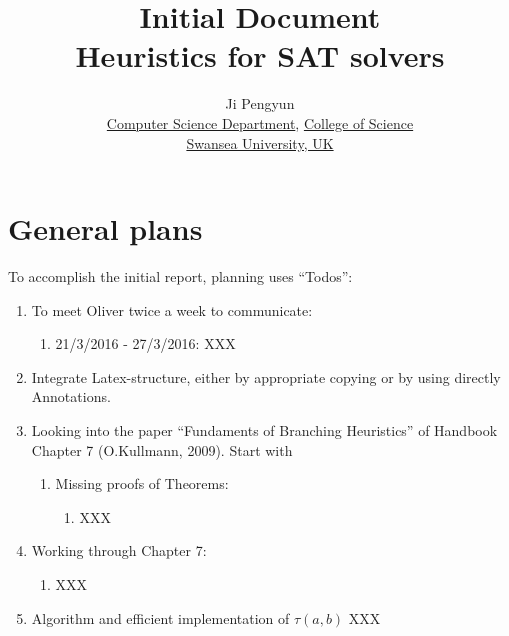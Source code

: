 \documentclass{report}
\begin{document}
\title{Initial Document\\Heuristics for SAT solvers}
\author{Ji Pengyun\\
  \href{http://www.swan.ac.uk/compsci/}{Computer Science Department}, \href{http://www.swan.ac.uk/science/}{College of Science}\\
   \href{http://www.swan.ac.uk/}{Swansea University, UK}\\
}

\maketitle

\tableofcontents

\chapter{General plans}
\label{cha:Generalpreparations}


To accomplish the initial report, planning uses ``Todos'':
\begin{enumerate}
	\item To meet Oliver twice a week to communicate:
	\begin{enumerate}[Week 1]
		\item 21/3/2016 - 27/3/2016: XXX
	\end{enumerate}
	\item Integrate Latex-structure, either by appropriate copying or by using directly Annotations.
	\item Looking into the paper ``Fundaments of Branching Heuristics'' of Handbook Chapter 7 (O.Kullmann, 2009). Start with
	\begin{enumerate}
		\item Missing proofs of Theorems:
		\begin{enumerate}
			\item XXX
		\end{enumerate}
	\end{enumerate}
	\item Working through Chapter 7:
	\begin{enumerate}
		\item XXX
	\end{enumerate}
	\item Algorithm and efficient implementation of $\tau(a,b)$ XXX
\end{enumerate}
\end{document}
